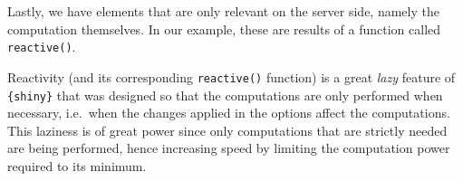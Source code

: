\documentclass[
]{book}
\newenvironment{Shaded}{\begin{snugshade}}{\end{snugshade}}
\newcommand{\AttributeTok}[1]{\textcolor[rgb]{0.77,0.63,0.00}{#1}}
\newcommand{\CommentTok}[1]{\textcolor[rgb]{0.56,0.35,0.01}{\textit{#1}}}
\newcommand{\ConstantTok}[1]{\textcolor[rgb]{0.00,0.00,0.00}{#1}}
\newcommand{\FunctionTok}[1]{\textcolor[rgb]{0.00,0.00,0.00}{#1}}
\newcommand{\NormalTok}[1]{#1}
\newcommand{\OtherTok}[1]{\textcolor[rgb]{0.56,0.35,0.01}{#1}}
\newcommand{\SpecialCharTok}[1]{\textcolor[rgb]{0.00,0.00,0.00}{#1}}
\newcommand{\StringTok}[1]{\textcolor[rgb]{0.31,0.60,0.02}{#1}}
\begin{document}
\begin{Shaded}
\end{Shaded}

Lastly, we have elements that are only relevant on the server side, namely the computation themselves. In our example, these are results of a function called \texttt{reactive()}.

Reactivity (and its corresponding \texttt{reactive()} function) is a great \emph{lazy} feature of \texttt{\{shiny\}} that was designed so that the computations are only performed when necessary, i.e.~when the changes applied in the options affect the computations. This laziness is of great power since only computations that are strictly needed are being performed, hence increasing speed by limiting the computation power required to its minimum.
\end{document}
